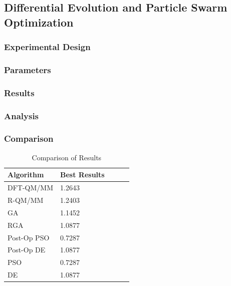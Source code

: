 \documentclass[10pt]{beamer}
\begin{document}



\subsection{Differential Evolution and Particle Swarm Optimization}

\begin{frame}
	\frametitle{Experimental Design}

\end{frame}

\begin{frame}
	\frametitle{Parameters}

\end{frame}

\begin{frame}
	\frametitle{Results}

\end{frame}

\begin{frame}
	\frametitle{Analysis}

\end{frame}

\begin{frame}
	\frametitle{Comparison}

	\begin{table}
		\caption{Comparison of Results}
		\begin{tabular}{ | l | l | l | l | l | }
		  \hline
		    Algorithm & Best Results \\ \hline
		    DFT-QM/MM & 1.2643 \\ \hline
		    R-QM/MM & 1.2403 \\ \hline
		    GA & 1.1452 \\ \hline
		    RGA & 1.0877 \\ \hline
		    Post-Op PSO & 0.7287 \\ \hline
		    Post-Op DE & 1.0877 \\ \hline
		    PSO & 0.7287 \\ \hline
		    DE & 1.0877 \\ \hline
		\end{tabular}
	\end{table}

\end{frame}
\end{document}
